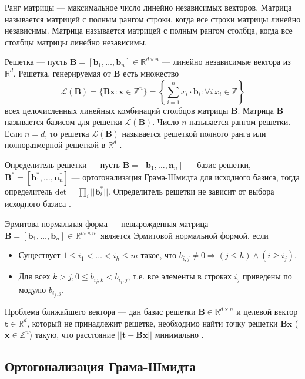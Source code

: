 Ранг матрицы –-- максимальное число линейно независимых векторов. Матрица называется матрицей с полным рангом строки, когда все строки матрицы линейно независимы. Матрица называется матрицей с полным рангом столбца, когда все столбцы матрицы линейно независимы.

Решетка --- пусть $ \mathbf{B} = [\mathbf{b}_1, \ldots, \mathbf{b}_n] \in \mathbb{R}^{d \times n} $ --- линейно независимые вектора из $ \mathbb{R}^d $. Решетка, генерируемая от $\mathbf{B}$ есть множество $$ \mathcal{L}(\mathbf{B}) = \lbrace \mathbf{Bx}: \mathbf{x} \in \mathbb{Z}^n \rbrace = \left\{ \sum\limits_{i=1}^n x_i \cdot \mathbf{b}_i: \forall i \ x_i \in \mathbb{Z} \right\} $$
всех целочисленных линейных комбинаций столбцов матрицы $\mathbf{B}$. Матрица $\mathbf{B}$ называется базисом для решетки $\mathcal{L}(\mathbf{B})$. Число $n$ называется рангом решетки. Если $n = d$, то решетка $\mathcal{L}(\mathbf{B})$ называется решеткой полного ранга или полноразмерной решеткой в $\mathbb{R}^d$ \cite{LatBook}. 

Определитель решетки --- пусть $ \mathbf{B} = \left[\mathbf{b}_1, \ldots, \mathbf{n}_n \right] $ --- базис решетки, $ \mathbf{B}^* = \left[\mathbf{b}^*_1, \ldots, \mathbf{n}^*_n \right] $ --- ортогонализация Грама-Шмидта для исходного базиса, тогда определитель $\mathrm{det} = \prod_i ||\mathbf{b}^*_i||$. Определитель решетки не зависит от выбора исходного базиса \cite{lec1}. 

Эрмитова нормальная форма \cite{lec4} --- невырожденная матрица $ \mathbf{B}=\left[\mathbf{b}_1, \ldots, \mathbf{b}_n\right] \in \mathbb{R}^{m \times n}\ $ является Эрмитовой нормальной формой, если

\begin{itemize}
\item Существует $ 1 \le i_1 < \ldots < i_h \le m $ такое, что $ b_{i,j} \neq 0 \Rightarrow (j \leq h) \land (i \geq i_j) $.
\item Для всех $ k>j, 0 \le b_{{i_j,k}}<b_{i_j,j} $, т.е. все элементы в строках $ i_j $ приведены по модулю $ b_{i_j, j} $.
\end{itemize}

Проблема ближайшего вектора --- дан базис решетки $ \mathbf{B} \in \mathbb{R}^{d \times n} $ и целевой вектор $ \mathbf{t} \in \mathbb{R}^d $, который не принадлежит решетке, необходимо найти точку решетки $ \mathbf{Bx} $ ($ \mathbf{x} \in \mathbb{Z}^n $) такую, что расстояние $ ||\mathbf{t} - \mathbf{Bx}|| $ минимально \cite{lec4}. 

\subsection{Ортогонализация Грама-Шмидта}

